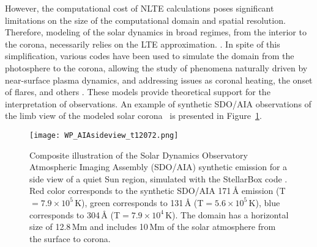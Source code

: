\documentclass[]{article}
\begin{document}
However, the computational cost of NLTE calculations poses significant limitations on the size of the computational domain and spatial resolution.
Therefore, modeling of the solar dynamics in broad regimes, from the interior to the corona, necessarily relies on the LTE approximation.  \citep[e.g.,][]{Rempel2017,Wray2018}. 
 In spite of this simplification, various codes have been used to simulate the domain from the photosphere to the corona, allowing the study of phenomena naturally driven by near-surface plasma dynamics, and addressing issues as coronal heating, the onset of flares, and others  \citep[e.g.,][]{Gudiksen2005,Carlsson2012,Rempel2017,Cheung2019}. These models provide theoretical support for the interpretation of observations. An example of synthetic SDO/AIA observations of the limb view of the modeled solar corona~\citep{Kitiashvili2020} is presented in Figure~\ref{fig:aiacorona}. %

\begin{figure}[t]
    \centering
    \texttt{[image: WP\_AIAsideview\_t12072.png]}
    \caption{Composite illustration of the Solar Dynamics Observatory Atmospheric Imaging Assembly (SDO/AIA) synthetic emission for a side view of a quiet Sun region, simulated with the StellarBox code \citep{Wray2018}. Red color corresponds to the synthetic SDO/AIA 171\,\AA{} emission (T$=7.9\times{}10^{5}$\,K), green corresponds to 131\,\AA{} (T$=5.6\times{}10^{5}$\,K), blue corresponds to 304\,\AA{} (T$=7.9\times{}10^{4}$\,K). The domain has a horizontal size of 12.8\,Mm and includes 10\,Mm of the solar atmosphere from the surface to corona.}
    \label{fig:aiacorona}
\end{figure}
\end{document}
